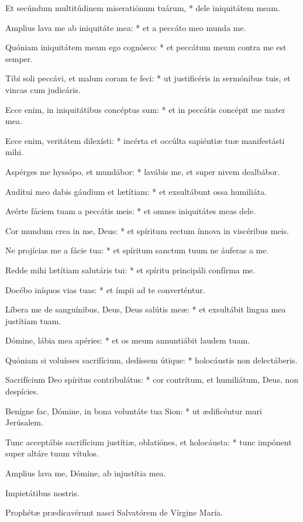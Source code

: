 Et secúndum multitúdinem miseratiónum tuárum, * dele iniquitátem meam.

Amplius lava me ab iniquitáte mea: * et a peccáto meo munda me.

Quóniam iniquitátem meam ego cognósco: * et peccátum meum contra me est semper.

Tibi soli peccávi, et malum coram te feci: * ut justificéris in sermónibus tuis, et vincas cum judicáris.

Ecce enim, in iniquitátibus concéptus sum: * et in peccátis concépit me mater mea.

Ecce enim, veritátem dilexísti: * incérta et occúlta sapiéntiæ tuæ manifestásti mihi.

Aspérges me hyssópo, et mundábor: * lavábis me, et super nivem dealbábor.

Audítui meo dabis gáudium et lætítiam: * et exsultábunt ossa humiliáta.

Avérte fáciem tuam a peccátis meis: * et omnes iniquitátes meas dele.

Cor mundum crea in me, Deus: * et spíritum rectum ínnova in viscéribus meis.

Ne projícias me a fácie tua: * et spíritum sanctum tuum ne áuferas a me.

Redde mihi lætítiam salutáris tui: * et spíritu principáli confírma me.

Docébo iníquos vias tuas: * et ímpii ad te converténtur.

Líbera me de sanguínibus, Deus, Deus salútis meæ: * et exsultábit lingua mea justítiam tuam.

Dómine, lábia mea apéries: * et os meum annuntiábit laudem tuam.

Quóniam si voluísses sacrifícium, dedíssem útique: * holocáustis non delectáberis.

Sacrifícium Deo spíritus contribulátus: * cor contrítum, et humiliátum, Deus, non despícies.

Benígne fac, Dómine, in bona voluntáte tua Sion: * ut ædificéntur muri Jerúsalem.

Tunc acceptábis sacrifícium justítiæ, oblatiónes, et holocáusta: * tunc impónent super altáre tuum vítulos.

 Amplius lava me, Dómine, ab injustítia mea.

 Impietátibus nostris.

  Prophétæ prædicavérunt nasci Salvatórem de Vírgine María.

